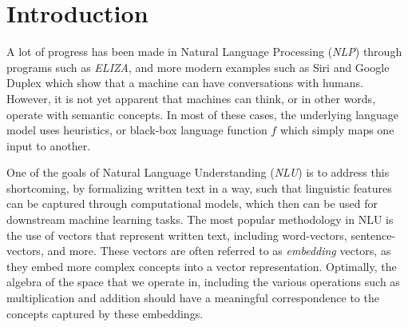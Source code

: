 \documentclass[a4paper,12pt,twoside,openright]{report}
\begin{document}
\pagestyle{fancy}

\fancyhf{}
\fancyhead[L]{\rightmark}
\fancyhead[R]{\thepage}
\renewcommand{\headrulewidth}{0pt}

\singlespacing

\onehalfspacing

\singlespacing


\setcounter{page}{0}
\pagestyle{plain}
\tableofcontents
\listoffigures
\listoftables

\onehalfspacing

\newcommand{\norm}[1]{\left\lVert#1\right\rVert}
\newcommand{\bracket}[1]{\left|#1\right|}
\newcommand{\absdet}[1]{\left|#1\right|}
\newcommand{\bftab}{\fontseries{b}\selectfont}

\newcolumntype{b}{X}

\setcounter{page}{1} 

\newpage
\chapter{Introduction}

A lot of progress has been made in Natural Language Processing (\textit{NLP}) through programs such as \textit{ELIZA}, and more modern examples such as Siri and Google Duplex which show that a machine can have conversations with humans. 
However, it is not yet apparent that machines can think, or in other words, operate with semantic concepts.
In most of these cases, the underlying language model uses heuristics, or black-box language function $f$ which simply maps one input to another.
 
One of the goals of Natural Language Understanding (\textit{NLU}) is to address this shortcoming, by formalizing written text in a way, such that linguistic features can be captured through computational models, which then can be used for downstream machine learning tasks.
The most popular methodology in NLU is the use of vectors that represent written text, including word-vectors, sentence-vectors, and more. 
These vectors are often referred to as \textit{embedding} vectors, as they embed more complex concepts into a vector representation.
Optimally, the algebra of the space that we operate in, including the various operations such as multiplication and addition should have a meaningful correspondence to the concepts captured by these embeddings.
\\
\end{document}
